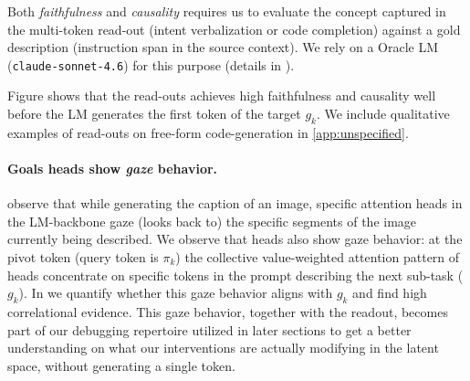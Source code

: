 Both \emph{faithfulness} and \emph{causality} requires us to evaluate the concept captured in the multi-token read-out (intent verbalization or code completion) against a gold description (instruction span in the source context). We rely on a Oracle LM (\texttt{claude-sonnet-4.6}) for this purpose (details in ).

{\color{red} Figure } shows that the read-outs achieves high faithfulness and causality well before the LM generates the first token of the target $g_k$. We include qualitative examples of read-outs on free-form code-generation in \cref{app:unspecified}. 




\paragraph{Goals heads show \emph{gaze} behavior.} \cite{gandikota2026gaze} observe that while generating the caption of an image, specific attention heads in the LM-backbone gaze (looks back to) the specific segments of the image currently being described. We observe that \goal heads also show gaze behavior: at the pivot token (query token is $\pi_k$) the collective value-weighted attention pattern of \goal heads concentrate on specific tokens in the prompt describing the next sub-task ($g_k$). In  we quantify whether this gaze behavior aligns with $g_k$ and find high correlational evidence. This gaze behavior, together with the readout, becomes part of our debugging repertoire utilized in later sections to get a better understanding on what our interventions are actually modifying in the latent space, without generating a single token.

